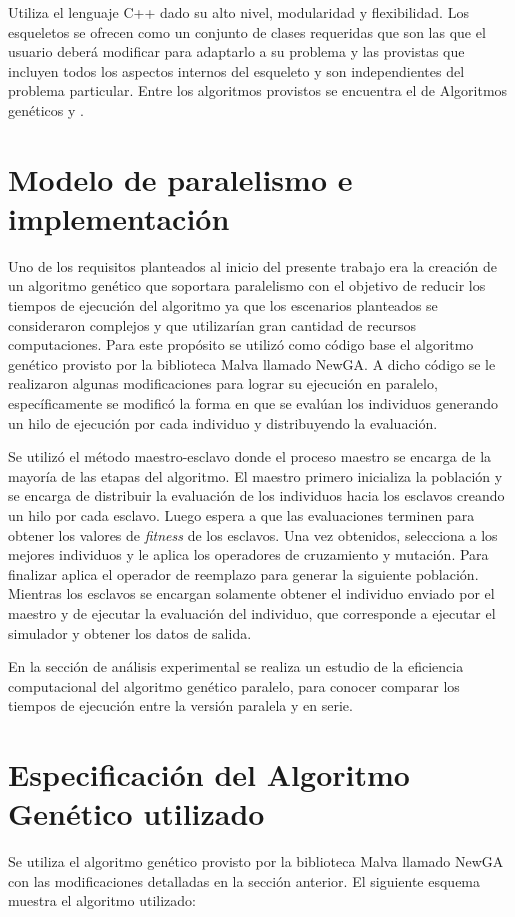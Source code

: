 Utiliza el lenguaje C++ dado su alto nivel, modularidad y flexibilidad. Los esqueletos se ofrecen como un conjunto de clases requeridas que son las que el usuario deberá modificar para adaptarlo a su problema y las provistas que incluyen todos los aspectos internos del esqueleto y son independientes del problema particular. Entre los algoritmos provistos se encuentra el de Algoritmos genéticos y \citet{CHC}.




\section{Modelo de paralelismo e implementación}

Uno de los requisitos planteados al inicio del presente trabajo era la creación de un algoritmo genético que soportara paralelismo con el objetivo de reducir los tiempos de ejecución del algoritmo ya que los escenarios planteados se consideraron complejos y que utilizarían gran cantidad de recursos computaciones. Para este propósito se utilizó como código base el algoritmo genético provisto por la biblioteca Malva llamado NewGA. A dicho código se le realizaron algunas modificaciones para lograr su ejecución en paralelo, específicamente se modificó la forma en que se evalúan los individuos generando un hilo de ejecución por cada individuo y distribuyendo la evaluación.
 
 Se utilizó el método maestro-esclavo donde el proceso maestro se encarga de la mayoría de las etapas del algoritmo. El maestro primero inicializa la población y se encarga de distribuir la evaluación de los individuos hacia los esclavos creando un hilo por cada esclavo. Luego espera a que las evaluaciones terminen para obtener los valores de \emph{fitness} de los esclavos. Una vez obtenidos, selecciona a los mejores individuos y le aplica los operadores de cruzamiento y mutación. Para finalizar aplica el operador de reemplazo para generar la siguiente población. Mientras los esclavos se encargan solamente obtener el individuo enviado por el maestro y de ejecutar la evaluación del individuo, que corresponde a ejecutar el simulador y obtener los datos de salida.
 
 En la sección de análisis experimental se realiza un estudio de la eficiencia computacional del algoritmo genético paralelo, para conocer comparar los tiempos de ejecución entre la versión paralela y en serie.

\section{Especificación del Algoritmo Genético utilizado}
Se utiliza el algoritmo genético provisto por la biblioteca  Malva  llamado NewGA con las modificaciones detalladas en la sección anterior. El siguiente esquema muestra el algoritmo utilizado:

